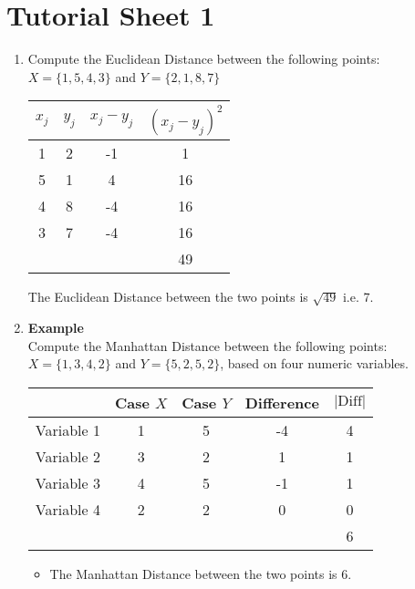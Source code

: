 \documentclass[]{report}
\begin{document}
\section*{Tutorial Sheet 1}
\begin{enumerate}
\item 
Compute the Euclidean Distance between the following points:
$X = \{1,5,4,3\}$ and $Y = \{2,1,8,7\}$

\begin{center}
	\begin{tabular}{|c|c|c|c|}
		\hline
		$x_j$	&	$y_j$	&   $x_j - y_j$	&	$(x_j - y_j)^2$	\\ \hline
		1	&	2	&	-1	&	1	\\
		5	&	1	&	4	&	16	\\
		4	&	8	&	-4	&	16	\\
		3	&	7	&	-4	&	16	\\ \hline
		&		&		&	49	\\ \hline
	\end{tabular}
\end{center}
The Euclidean Distance between the two points is $\sqrt{49}$ i.e. 7.





\item  \textbf{Example}\\
Compute the Manhattan Distance between the following points: 
$X = \{1,3,4,2\}$ and $Y = \{5,2,5,2\}$, based on four numeric variables.


\begin{center}
	\begin{tabular}{|c|c|c|c|c|}
		\hline
	&	Case $X$	&	Case $Y$	&   Difference	&	$| \mbox{Diff} |$	\\ \hline
Variable 1	&	1	&	5	&	-4	&	4	\\
Variable 2	&	3	&	2	&	1	&	1	\\
Variable 3	&	4	&	5	&	-1	&	1	\\
Variable 4	&	2	&	2	&	0	&	0	\\ \hline
		& & && 6 \\
		\hline
	\end{tabular}
\end{center}
\begin{itemize}
\item The Manhattan Distance between the two points is 6.
\end{itemize}


\end{enumerate}
\end{document}
